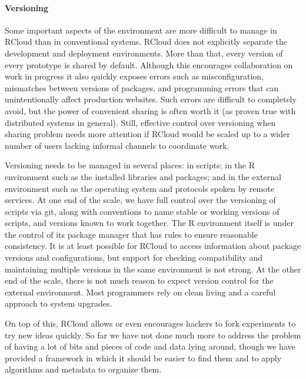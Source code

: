 \paragraph*{Versioning}
Some important aspects of the environment are more difficult to manage
in RCloud than in conventional systems. RCloud does not explicitly
separate the development and deployment environments. More than that,
every version of every prototype is shared by default. Although this encourages
collaboration on work in progress it also quickly exposes errors such as
misconfiguration, mismatches between versions of packages, and programming
errors that can unintentionally affect production websites. Such errors
are difficult to completely avoid, but the power of convenient sharing is often
worth it (as proven true with distributed systems in general).
Still, effective control over versioning when sharing problem needs more
attention if RCloud would be scaled up to a wider number of users lacking
informal channels to coordinate work.

Versioning needs to be managed in several places: in scripts;
in the R environment such as the installed libraries and packages;
and in the external environment such as the operating system and
protocols spoken by remote services. At one end of the scale, we have
full control over the versioning of scripts via git, along with conventions
to name stable or working versions of scripts, and versions known to work together.
The R environment itself is under the control of its package manager
that has rules to ensure reasonable consistency.
It is at least possible for RCloud to access information about
package versions and configurations, but support for checking compatibility
and maintaining multiple versions in the same environment is not strong.
At the other end of the scale, there is not much reason to expect version
control for the external environment. Most programmers rely on clean living
and a careful approach to system upgrades.

On top of this, RCloud allows or even encourages hackers to fork experiments
to try new ideas quickly. So far we have not done much more to address the
problem of having a lot of bits and pieces of code and data lying around,
though we have provided a framework in which it should be easier to find them
and to apply algorithms and metadata to organize them.



